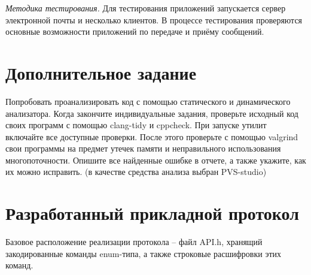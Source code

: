 \textit{Методика тестирования.}
Для тестирования приложений запускается сервер электронной почты и несколько клиентов. В процессе тестирования проверяются основные возможности приложений по передаче и приёму сообщений.

\section{Дополнительное задание}

Попробовать проанализировать код с помощью статического и динамического анализатора. Когда закончите индивидуальные задания, проверьте исходный код своих программ с помощью clang-tidy и cppcheck. При запуске утилит включайте все доступные проверки. После этого проверьте с помощью valgrind свои программы на предмет утечек памяти и неправильного использования многопоточности. Опишите все найденные ошибке в отчете, а также укажите, как их можно исправить. (в качестве средства анализа выбран PVS-studio)



\section{Разработанный прикладной протокол}

Базовое расположение реализации протокола – файл API.h, хранящий закодированные команды enum-типа, а также строковые расшифровки этих команд.


